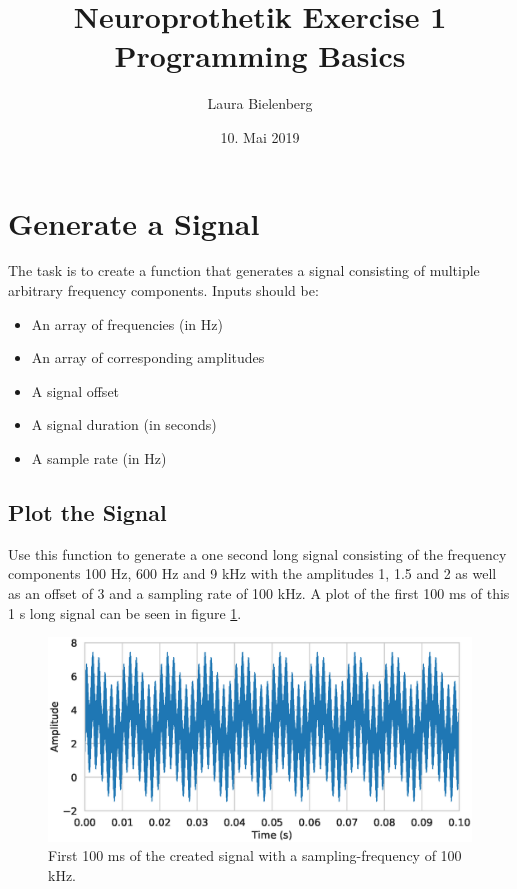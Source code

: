 \documentclass{scrartcl}			%
\title{Neuroprothetik Exercise 1 \\ Programming Basics}
\author{ Laura Bielenberg }
\date{10. Mai 2019}
\begin{document}

\maketitle

\section{Generate a Signal}		%

The task is to create a function that generates a signal consisting of multiple arbitrary frequency components. Inputs should be:

\begin{itemize}
\item An array of frequencies (in Hz)
\item An array of corresponding amplitudes
\item A signal offset
\item A signal duration (in seconds)
\item A sample rate (in Hz)
\end{itemize}

\subsection{Plot the Signal}		%

Use this function to generate a one second long signal consisting of the frequency components 100 Hz, 600 Hz and 9 kHz with the amplitudes 1, 1.5 and 2 as well as an offset of 3 and a sampling rate of 100 kHz. A plot of the first 100 ms of this 1 s long signal can be seen in figure \ref{fig:signalPlot}.
\newpage
\begin{figure}[h!]					%
	\centering
	\includegraphics[width=\textwidth]{imgs/signalDataPlot.eps}
	\captionsetup{width=\textwidth}  %
	\caption{First 100 ms of the created signal with a sampling-frequency of 100 kHz.}
	\label{fig:signalPlot} %
\end{figure}
\end{document}
